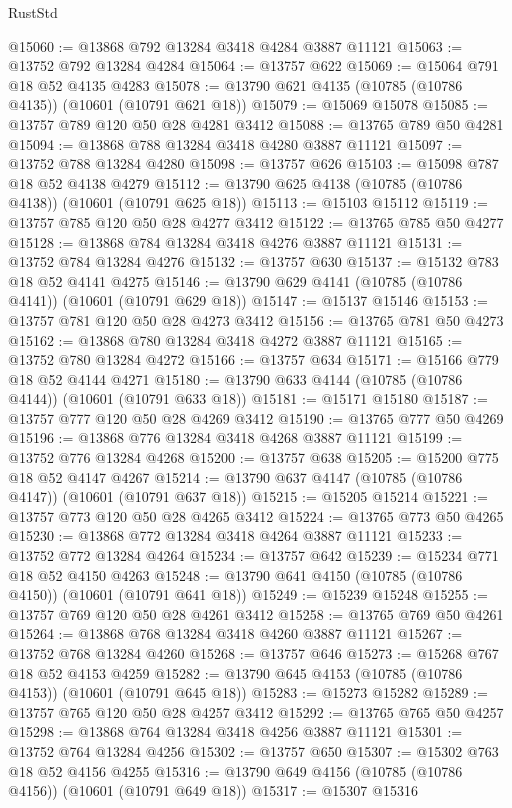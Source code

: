 \begin{lexlean}{RustStd}
\begin{coremodule}
@15060 := @13868 @792 @13284 @3418 @4284 @3887 @11121
@15063 := @13752 @792 @13284 @4284
@15064 := @13757 @622
@15069 := @15064 @791 @18 @52 @4135 @4283
@15078 := @13790 @621 @4135 (@10785 (@10786 @4135)) (@10601 (@10791 @621 @18))
@15079 := @15069 @15078
@15085 := @13757 @789 @120 @50 @28 @4281 @3412
@15088 := @13765 @789 @50 @4281
@15094 := @13868 @788 @13284 @3418 @4280 @3887 @11121
@15097 := @13752 @788 @13284 @4280
@15098 := @13757 @626
@15103 := @15098 @787 @18 @52 @4138 @4279
@15112 := @13790 @625 @4138 (@10785 (@10786 @4138)) (@10601 (@10791 @625 @18))
@15113 := @15103 @15112
@15119 := @13757 @785 @120 @50 @28 @4277 @3412
@15122 := @13765 @785 @50 @4277
@15128 := @13868 @784 @13284 @3418 @4276 @3887 @11121
@15131 := @13752 @784 @13284 @4276
@15132 := @13757 @630
@15137 := @15132 @783 @18 @52 @4141 @4275
@15146 := @13790 @629 @4141 (@10785 (@10786 @4141)) (@10601 (@10791 @629 @18))
@15147 := @15137 @15146
@15153 := @13757 @781 @120 @50 @28 @4273 @3412
@15156 := @13765 @781 @50 @4273
@15162 := @13868 @780 @13284 @3418 @4272 @3887 @11121
@15165 := @13752 @780 @13284 @4272
@15166 := @13757 @634
@15171 := @15166 @779 @18 @52 @4144 @4271
@15180 := @13790 @633 @4144 (@10785 (@10786 @4144)) (@10601 (@10791 @633 @18))
@15181 := @15171 @15180
@15187 := @13757 @777 @120 @50 @28 @4269 @3412
@15190 := @13765 @777 @50 @4269
@15196 := @13868 @776 @13284 @3418 @4268 @3887 @11121
@15199 := @13752 @776 @13284 @4268
@15200 := @13757 @638
@15205 := @15200 @775 @18 @52 @4147 @4267
@15214 := @13790 @637 @4147 (@10785 (@10786 @4147)) (@10601 (@10791 @637 @18))
@15215 := @15205 @15214
@15221 := @13757 @773 @120 @50 @28 @4265 @3412
@15224 := @13765 @773 @50 @4265
@15230 := @13868 @772 @13284 @3418 @4264 @3887 @11121
@15233 := @13752 @772 @13284 @4264
@15234 := @13757 @642
@15239 := @15234 @771 @18 @52 @4150 @4263
@15248 := @13790 @641 @4150 (@10785 (@10786 @4150)) (@10601 (@10791 @641 @18))
@15249 := @15239 @15248
@15255 := @13757 @769 @120 @50 @28 @4261 @3412
@15258 := @13765 @769 @50 @4261
@15264 := @13868 @768 @13284 @3418 @4260 @3887 @11121
@15267 := @13752 @768 @13284 @4260
@15268 := @13757 @646
@15273 := @15268 @767 @18 @52 @4153 @4259
@15282 := @13790 @645 @4153 (@10785 (@10786 @4153)) (@10601 (@10791 @645 @18))
@15283 := @15273 @15282
@15289 := @13757 @765 @120 @50 @28 @4257 @3412
@15292 := @13765 @765 @50 @4257
@15298 := @13868 @764 @13284 @3418 @4256 @3887 @11121
@15301 := @13752 @764 @13284 @4256
@15302 := @13757 @650
@15307 := @15302 @763 @18 @52 @4156 @4255
@15316 := @13790 @649 @4156 (@10785 (@10786 @4156)) (@10601 (@10791 @649 @18))
@15317 := @15307 @15316

\end{coremodule}
\end{lexlean}
